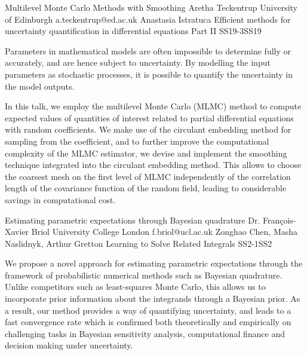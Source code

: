 \begin{talk}
  {Multilevel Monte Carlo Methods with Smoothing}%
  {Aretha Teckentrup}%
  {University of Edinburgh}%
  {a.teckentrup@ed.ac.uk}%
  {Anastasia Istratuca}%
{Efficient methods for uncertainty quantification in differential equations Part II}
{}{SS19-3}{SS19}


				
				

Parameters in mathematical models are often impossible to determine fully or accurately, and are hence subject to uncertainty. By modelling the input parameters as stochastic processes, it is possible to quantify the uncertainty in the model outputs. 

In this talk, we employ the multilevel Monte Carlo (MLMC) method to compute expected values of quantities of interest related to partial differential equations with random coefficients. We make use of the circulant embedding method for sampling from the coefficient, and to further improve the computational complexity of the MLMC estimator, we devise and implement the smoothing technique integrated into the circulant embedding method. This allows to choose the coarsest mesh on the first level of MLMC independently of the correlation length of the covariance function of the random field, leading to considerable savings in computational cost.
\end{talk}

\begin{talk}
  {Estimating parametric expectations through Bayesian quadrature}%
  {Dr. Fran\c{c}ois-Xavier Briol}%
  {University College London}%
  {f.briol@ucl.ac.uk}%
  {Zonghao Chen, Masha Naslidnyk, Arthur Gretton}%
{Learning to Solve Related Integrals}
{}{SS2-1}{SS2}

			
We propose a novel approach for estimating parametric expectations through the framework of probabilistic numerical methods such as Bayesian quadrature. Unlike competitors such as least-squares Monte Carlo, this allows us to incorporate prior information about the integrands through a Bayesian prior. As a result, our method provides a way of quantifying uncertainty, and leads to a fast convergence rate which is confirmed both theoretically and empirically on challenging tasks in Bayesian sensitivity analysis, computational finance and decision making under  uncertainty.
\end{talk}

